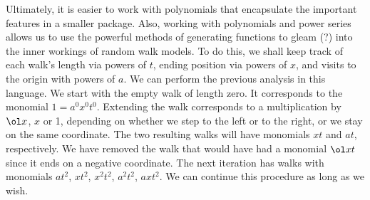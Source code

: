 Ultimately, it is easier to work with polynomials that encapsulate the important features in a smaller package. Also, working with polynomials and power series allows us to use the powerful methods of generating functions to gleam (?) into the inner workings of random walk models. To do this, we shall keep track of each walk's length via powers of $t$, ending position via powers of $x$, and visits to the origin with powers of $a$. We can perform the previous analysis in this language. We start with the empty walk of length zero. It corresponds to the monomial $1 = a^0x^0t^0$. Extending the walk corresponds to a multiplication by $\ol x$, $x$ or 1, depending on whether we step to the left or to the right, or we stay on the same coordinate. The two resulting walks will have monomials $xt$ and $at$, respectively. We have removed the walk that would have had a monomial $\ol x t$ since it ends on a negative coordinate. The next iteration has walks with monomials $at^2$, $xt^2$, $x^2t^2$, $a^2t^2$, $axt^2$. We can continue this procedure as long as we wish.

